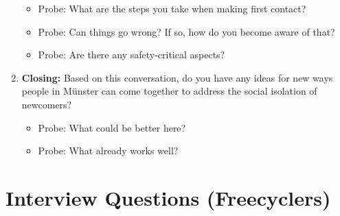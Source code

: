 \begin{enumerate}
    \begin{itemize}
        \item Probe: What are the steps you take when making first contact?
        \item Probe: Can things go wrong? If so, how do you become aware of that?
        \item Probe: Are there any safety-critical aspects?
    \end{itemize}

    \item \textbf{Closing:} Based on this conversation, do you have any ideas for new ways people in Münster can come together to address the social isolation of newcomers?

    \begin{itemize}
        \item Probe: What could be better here?
        \item Probe: What already works well?
    \end{itemize}
\end{enumerate}





\section{Interview Questions (Freecyclers)}
\label{app:interview-questions-freecyclers}


